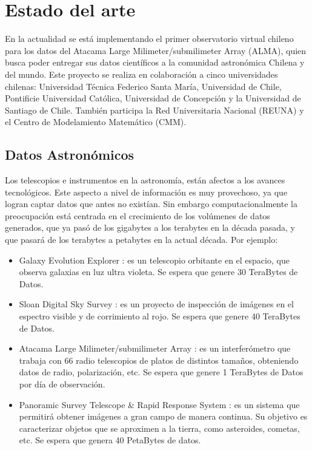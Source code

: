 \section{Estado del arte}

En la actualidad se está implementando el primer observatorio virtual chileno
para los datos del Atacama Large Milimeter/submilimeter Array (ALMA), quien
busca poder entregar sus datos científicos a la comunidad astronómica Chilena y
del mundo. Este proyecto se realiza en colaboración a cinco universidades
chilenas: Universidad Técnica Federico Santa María, Universidad de Chile,
Pontificie Universidad Católica, Universidad de Concepción y la Universidad de
Santiago de Chile. También participa la Red Universitaria Nacional (REUNA) y el
Centro de Modelamiento Matemático (CMM).

\subsection{Datos Astronómicos}
Los telescopios e instrumentos en la astronomía, están afectos a los avances
tecnológicos. Este aspecto a nivel de información es muy provechoso, ya que
logran captar datos que antes no existían. Sin embargo computacionalmente la
preocupación está centrada en el crecimiento de los volúmenes de datos
generados, que ya pasó de los gigabytes a los terabytes en la década pasada, y
que pasará de los terabytes a petabytes en la actual década. Por ejemplo:
\begin{itemize}
	\item Galaxy Evolution Explorer \cite{galex}: es un telescopio
orbitante en el espacio, que observa galaxias en luz ultra violeta. Se espera
que genere 30 TeraBytes de Datos.
	\item Sloan Digital Sky Survey \cite{sloan}: es un proyecto de inspección de
imágenes en el espectro visible y de corrimiento al rojo. Se espera que genere
40 TeraBytes de Datos.
	\item Atacama Large Milimeter/submilimeter Array \cite{alma}: es un
interferómetro que trabaja con 66 radio telescopios de platos de distintos
tamaños, obteniendo datos de radio, polarización, etc. Se espera que genere 1
TeraBytes de Datos por día de observación.
	\item Panoramic Survey Telescope \& Rapid Response System \cite{pan}:
es un sistema que permitirá obtener imágenes a gran campo de manera continua.
Su objetivo es caracterizar objetos que se aproximen a la tierra, como
asteroides, cometas, etc. Se espera que genera 40 PetaBytes de datos.
\end{itemize}

